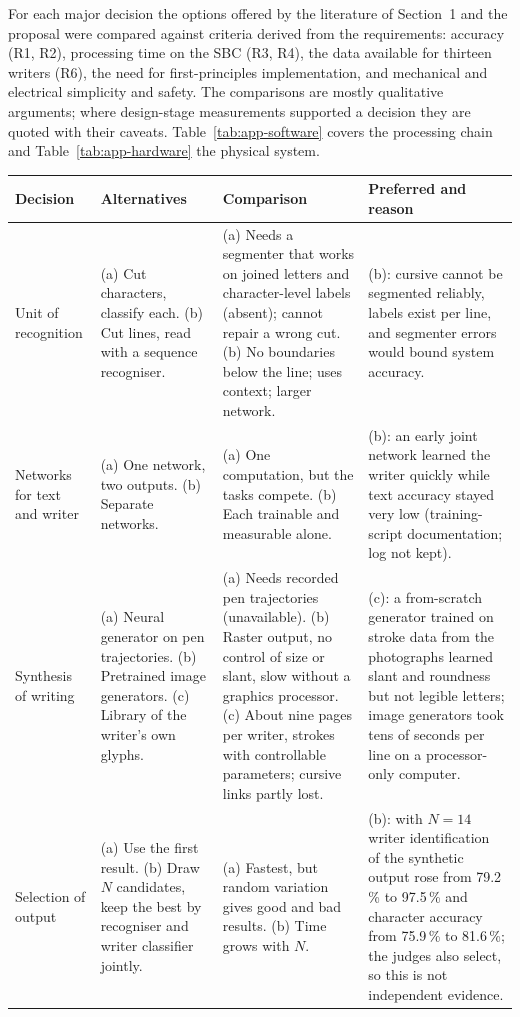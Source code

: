 For each major decision the options offered by the literature of Section~1 and the proposal were compared against criteria derived from the requirements: accuracy (R1, R2), processing time on the SBC (R3, R4), the data available for thirteen writers (R6), the need for first-principles implementation, and mechanical and electrical simplicity and safety. The comparisons are mostly qualitative arguments; where design-stage measurements supported a decision they are quoted with their caveats. Table~\ref{tab:app-software} covers the processing chain and Table~\ref{tab:app-hardware} the physical system.

\begin{table}[htbp]
\centering
\fontsize{9}{10.5}\selectfont
\begin{tabular}{|p{1.6cm}|p{3.4cm}|p{4.3cm}|p{4.3cm}|}
\hline
\textbf{Decision} & \textbf{Alternatives} & \textbf{Comparison} & \textbf{Preferred and reason} \\
\hline
Unit of recognition & (a) Cut characters, classify each. (b) Cut lines, read with a sequence recogniser. & (a) Needs a segmenter that works on joined letters and character-level labels (absent); cannot repair a wrong cut. (b) No boundaries below the line; uses context; larger network. & (b): cursive cannot be segmented reliably, labels exist per line, and segmenter errors would bound system accuracy. \\
\hline
Networks for text and writer & (a) One network, two outputs. (b) Separate networks. & (a) One computation, but the tasks compete. (b) Each trainable and measurable alone. & (b): an early joint network learned the writer quickly while text accuracy stayed very low (training-script documentation; log not kept). \\
\hline
Synthesis of writing & (a) Neural generator on pen trajectories. (b) Pretrained image generators. (c) Library of the writer's own glyphs. & (a) Needs recorded pen trajectories (unavailable). (b) Raster output, no control of size or slant, slow without a graphics processor. (c) About nine pages per writer, strokes with controllable parameters; cursive links partly lost. & (c): a from-scratch generator trained on stroke data from the photographs learned slant and roundness but not legible letters; image generators took tens of seconds per line on a processor-only computer. \\
\hline
Selection of output & (a) Use the first result. (b) Draw $N$ candidates, keep the best by recogniser and writer classifier jointly. & (a) Fastest, but random variation gives good and bad results. (b) Time grows with $N$. & (b): with $N=14$ writer identification of the synthetic output rose from 79.2\,\% to 97.5\,\% and character accuracy from 75.9\,\% to 81.6\,\%; the judges also select, so this is not independent evidence. \\

\end{tabular}
\end{table}
